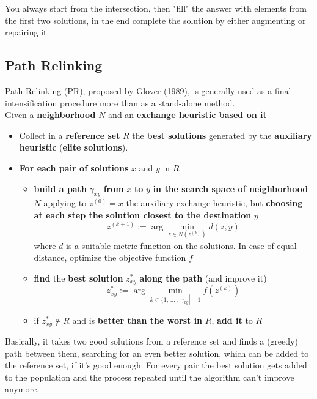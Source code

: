You always start from the intersection, then "fill" the answer with elements from the first two solutions, in the end complete the solution by either augmenting or repairing it.\\

\newpage

\subsection{Path Relinking}
Path Relinking (PR), proposed by Glover (1989), is generally used as a final intensification procedure more than as a stand-alone method.\\

Given a \textbf{neighborhood} $N$ and an \textbf{exchange heuristic based on it}
\begin{itemize}
	\item Collect in a \textbf{reference set} $R$ the \textbf{best solutions} generated by the \textbf{auxiliary heuristic} (\textbf{elite solutions}).\\
	
	\item \textbf{For each pair of solutions} $x$ and $y$ in $R$
	\begin{itemize}
		\item \textbf{build a path} $\gamma_{xy}$ \textbf{from} $x$ \textbf{to} $y$ \textbf{in the search space of neighborhood} $N$ applying to $z^{(0)} = x$ the auxiliary exchange heuristic, but \textbf{choosing at each step the solution closest to the destination} $y$
		$$ z^{(k+1)} := \arg \min_{z \in N(z^{(k)})} d (z, y ) $$
		where $d$ is a suitable metric function on the solutions. In case of equal distance, optimize the objective function $f$
		
		\item \textbf{find} the \textbf{best solution} $z_{xy}^\ast$ \textbf{along the path} (and improve it)
		$$ z^\ast_{xy} := \arg \min_{k \in \{1 , \, ... \, , |\gamma_{xy}| - 1} f (z^{(k)}) $$
		
		\item if $z^\ast_{xy} \notin R$ and is \textbf{better than the worst in} $R$, \textbf{add it} to $R$
	\end{itemize}
	\nn
\end{itemize}

Basically, it takes two good solutions from a reference set and finds a (greedy) path between them, searching for an even better solution, which can be added to the reference set, if it's good enough. For every pair the best solution gets added to the population and the process repeated until the algorithm can't improve anymore.\\

